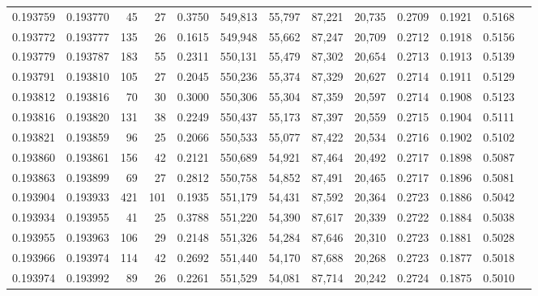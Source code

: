 \begin{tabular}{rrrrrrrrrrrrr}
0.193759 & 0.193770 &    45 &  27 &                                     0.3750 & 549,813 &  55,797 &  87,221 &  20,735 & 0.2709 & 0.1921 & 0.5168 \\
0.193772 & 0.193777 &   135 &  26 &                                     0.1615 & 549,948 &  55,662 &  87,247 &  20,709 & 0.2712 & 0.1918 & 0.5156 \\
0.193779 & 0.193787 &   183 &  55 &                                     0.2311 & 550,131 &  55,479 &  87,302 &  20,654 & 0.2713 & 0.1913 & 0.5139 \\
0.193791 & 0.193810 &   105 &  27 &                                     0.2045 & 550,236 &  55,374 &  87,329 &  20,627 & 0.2714 & 0.1911 & 0.5129 \\
0.193812 & 0.193816 &    70 &  30 &                                     0.3000 & 550,306 &  55,304 &  87,359 &  20,597 & 0.2714 & 0.1908 & 0.5123 \\
0.193816 & 0.193820 &   131 &  38 &                                     0.2249 & 550,437 &  55,173 &  87,397 &  20,559 & 0.2715 & 0.1904 & 0.5111 \\
0.193821 & 0.193859 &    96 &  25 &                                     0.2066 & 550,533 &  55,077 &  87,422 &  20,534 & 0.2716 & 0.1902 & 0.5102 \\
0.193860 & 0.193861 &   156 &  42 &                                     0.2121 & 550,689 &  54,921 &  87,464 &  20,492 & 0.2717 & 0.1898 & 0.5087 \\
0.193863 & 0.193899 &    69 &  27 &                                     0.2812 & 550,758 &  54,852 &  87,491 &  20,465 & 0.2717 & 0.1896 & 0.5081 \\
0.193904 & 0.193933 &   421 & 101 &                                     0.1935 & 551,179 &  54,431 &  87,592 &  20,364 & 0.2723 & 0.1886 & 0.5042 \\
0.193934 & 0.193955 &    41 &  25 &                                     0.3788 & 551,220 &  54,390 &  87,617 &  20,339 & 0.2722 & 0.1884 & 0.5038 \\
0.193955 & 0.193963 &   106 &  29 &                                     0.2148 & 551,326 &  54,284 &  87,646 &  20,310 & 0.2723 & 0.1881 & 0.5028 \\
0.193966 & 0.193974 &   114 &  42 &                                     0.2692 & 551,440 &  54,170 &  87,688 &  20,268 & 0.2723 & 0.1877 & 0.5018 \\
0.193974 & 0.193992 &    89 &  26 &                                     0.2261 & 551,529 &  54,081 &  87,714 &  20,242 & 0.2724 & 0.1875 & 0.5010 \\

\end{tabular}

